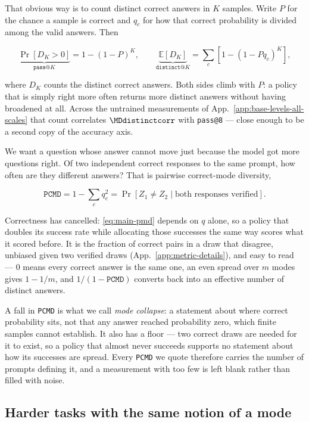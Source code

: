 \documentclass{article}
\newcommand{\1}{\mathbf 1}
\newcommand{\E}{\mathbb E}
\newcommand{\pmd}{\texttt{PCMD}}
\theoremstyle{remark}
\theoremstyle{definition}
\theoremstyle{plain}
\begin{document}
That obvious way is to count distinct correct answers in $K$ samples. Write $P$
for the chance a sample is correct and $q_c$ for how that correct probability is
divided among the valid answers. Then

\begin{equation}
 \underbrace{\Pr[D_K>0]}_{\texttt{pass@}K}=1-(1-P)^K,
 \qquad
 \underbrace{\E[D_K]}_{\texttt{distinct@}K}
 =\sum_c[1-(1-Pq_c)^K],
 \label{eq:main-occupancy}
\end{equation}

where $D_K$ counts the distinct correct answers. Both sides climb with $P$: a
policy that is simply right more often returns more distinct answers without
having broadened at all. Across the \MDcells{} untrained measurements of
App.~\ref{app:base-levels-all-scales} that count correlates
$\MDdistinctcorr$ with \texttt{pass@8} --- close enough to be a second copy of
the accuracy axis.

We want a question whose answer cannot move just because the model got more
questions right. Of two independent correct responses to the same prompt, how
often are they different answers? That is pairwise correct-mode diversity,

\begin{equation}
 \pmd = 1-\sum_c q_c^2
 = \Pr[Z_1\ne Z_2\mid \text{both responses verified}].
 \label{eq:main-pmd}
\end{equation}

Correctness has cancelled: \eqref{eq:main-pmd} depends on $q$ alone, so a policy
that doubles its success rate while allocating those successes the same way
scores what it scored before. It is the fraction of correct pairs in a draw that
disagree, unbiased given two verified draws
(App.~\ref{app:metric-details}), and easy to read --- $0$ means every correct answer is the same one, an even spread over
$m$ modes gives $1-1/m$, and $1/(1-\pmd{})$ converts back into an effective
number of distinct answers.

A fall in \pmd{} is what we call \emph{mode collapse}: a statement about where
correct probability sits, not that any answer reached probability zero, which
finite samples cannot establish. It also has a floor --- two correct draws are
needed for it to exist, so a policy that almost never succeeds supports no
statement about how its successes are spread. Every \pmd{} we quote therefore
carries the number of prompts defining it, and a measurement with too few is
left blank rather than filled with noise.

\subsection{Harder tasks with the same notion of a mode}
\label{sec:levels-design}
\end{document}
